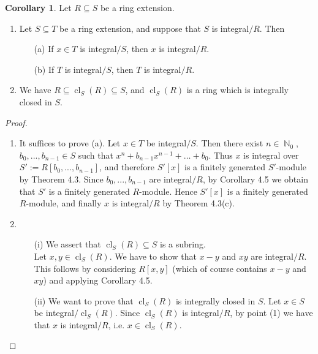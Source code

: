\documentclass[12pt,a4paper]{report}
\theoremstyle{definition}
\newtheorem{corollary}[theorem]{Corollary} %
\theoremstyle{num.custom-title}
\DeclareMathOperator{\N}{\mathbb{N}}
\DeclareMathOperator{\sse}{\subseteq}
\DeclareMathOperator{\cl}{cl}
\begin{document}
\begin{corollary}
Let $R \sse S$ be a ring extension.
\begin{enumerate}
\item Let $S \sse T$ be a ring extension, and suppose that $S$ is integral$/R$. Then
\begin{itemize}
\item[(a)] If $x \in T$ is integral$/S$, then $x$ is integral$/R$.
\item[(b)] If $T$ is integral$/S$, then $T$ is integral$/R$.
\end{itemize}
\item We have $R \sse \cl_S(R) \sse S$, and $\cl_S(R)$ is a ring which is integrally closed in $S$.
\end{enumerate}
\begin{proof}\ 
\begin{enumerate}
\item It suffices to prove (a). Let $x \in T$ be integral$/S$. Then there exist $n \in \N_0$, $b_0,...,b_{n-1} \in S$ such that $x^n+b_{n-1}x^{n-1} + \ldots + b_0$. Thus $x$ is integral over $S':=R[b_0,...,b_{n-1}]$, and therefore $S'[x]$ is a finitely generated $S'$-module by Theorem 4.3. Since $b_0,...,b_{n-1}$ are integral$/R$, by Corollary 4.5 we obtain that $S'$ is a finitely generated $R$-module. Hence $S'[x]$ is a finitely generated $R$-module, and finally $x$ is integral$/R$ by Theorem 4.3(c).
\item
\begin{itemize}
\item[(i)] We assert that $\cl_S(R) \sse S$ is a subring.\\
Let $x,y \in \cl_S(R)$. We have to show that $x-y$ and $xy$ are integral$/R$. This follows by considering $R[x,y]$ (which of course contains $x-y$ and $xy$) and applying Corollary 4.5.
\item[(ii)] We want to prove that $\cl_S(R)$ is integrally closed in $S$. Let $x \in S$ be integral$/\cl_S(R)$. Since $\cl_S(R)$ is integral$/R$, by point (1) we have that $x$ is integral$/R$, i.e. $x \in \cl_S(R)$.
\end{itemize}
\end{enumerate}
\end{proof}
\end{corollary}
\end{document}
